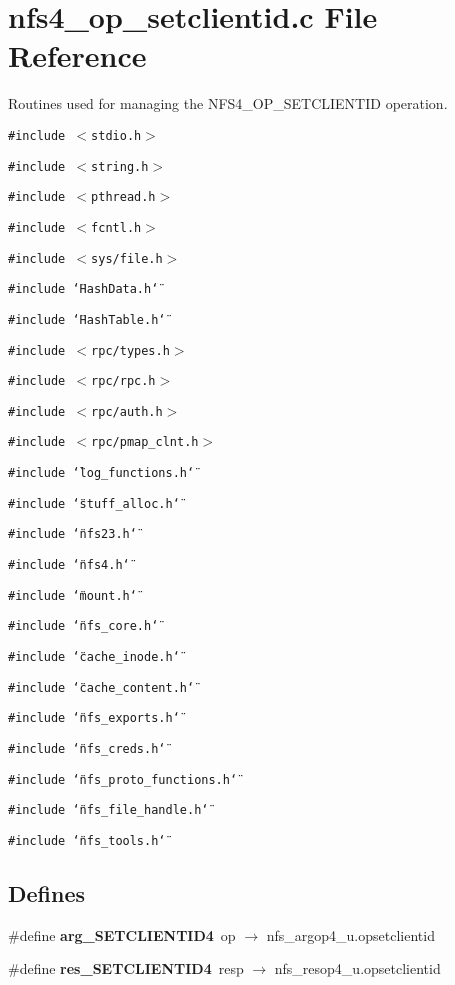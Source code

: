 \section{nfs4\_\-op\_\-setclientid.c File Reference}
\label{nfs4__op__setclientid_8c}
Routines used for managing the NFS4\_\-OP\_\-SETCLIENTID operation. 

{\tt \#include $<$stdio.h$>$}\par
{\tt \#include $<$string.h$>$}\par
{\tt \#include $<$pthread.h$>$}\par
{\tt \#include $<$fcntl.h$>$}\par
{\tt \#include $<$sys/file.h$>$}\par
{\tt \#include \char`\"{}Hash\-Data.h\char`\"{}}\par
{\tt \#include \char`\"{}Hash\-Table.h\char`\"{}}\par
{\tt \#include $<$rpc/types.h$>$}\par
{\tt \#include $<$rpc/rpc.h$>$}\par
{\tt \#include $<$rpc/auth.h$>$}\par
{\tt \#include $<$rpc/pmap\_\-clnt.h$>$}\par
{\tt \#include \char`\"{}log\_\-functions.h\char`\"{}}\par
{\tt \#include \char`\"{}stuff\_\-alloc.h\char`\"{}}\par
{\tt \#include \char`\"{}nfs23.h\char`\"{}}\par
{\tt \#include \char`\"{}nfs4.h\char`\"{}}\par
{\tt \#include \char`\"{}mount.h\char`\"{}}\par
{\tt \#include \char`\"{}nfs\_\-core.h\char`\"{}}\par
{\tt \#include \char`\"{}cache\_\-inode.h\char`\"{}}\par
{\tt \#include \char`\"{}cache\_\-content.h\char`\"{}}\par
{\tt \#include \char`\"{}nfs\_\-exports.h\char`\"{}}\par
{\tt \#include \char`\"{}nfs\_\-creds.h\char`\"{}}\par
{\tt \#include \char`\"{}nfs\_\-proto\_\-functions.h\char`\"{}}\par
{\tt \#include \char`\"{}nfs\_\-file\_\-handle.h\char`\"{}}\par
{\tt \#include \char`\"{}nfs\_\-tools.h\char`\"{}}\par
\subsection*{Defines}
\begin{CompactItemize}
\item 
\#define {\bf arg\_\-SETCLIENTID4}\ op $\rightarrow$ nfs\_\-argop4\_\-u.opsetclientid
\item 
\#define {\bf res\_\-SETCLIENTID4}\ resp $\rightarrow$ nfs\_\-resop4\_\-u.opsetclientid
\end{CompactItemize}
